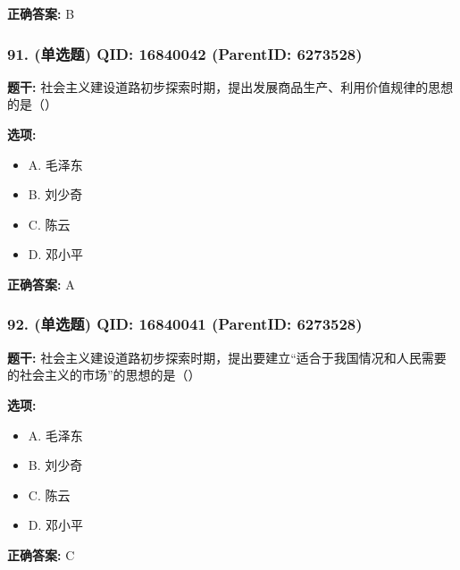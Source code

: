 \documentclass[12pt,UTF8]{ctexart}
\begin{document}
\textbf{正确答案:}
B

\vspace{0.3em}\hrulefill\vspace{0.7em}

\subsubsection*{91. (单选题) \small QID: 16840042 (ParentID: 6273528)}

\textbf{题干:}
社会主义建设道路初步探索时期，提出发展商品生产、利用价值规律的思想的是（）



\textbf{选项:}
\begin{itemize}[leftmargin=*]

  \item A. 毛泽东

  \item B. 刘少奇

  \item C. 陈云

  \item D. 邓小平

\end{itemize}

\textbf{正确答案:}
A

\vspace{0.3em}\hrulefill\vspace{0.7em}

\subsubsection*{92. (单选题) \small QID: 16840041 (ParentID: 6273528)}

\textbf{题干:}
社会主义建设道路初步探索时期，提出要建立“适合于我国情况和人民需要的社会主义的市场”的思想的是（）



\textbf{选项:}
\begin{itemize}[leftmargin=*]

  \item A. 毛泽东

  \item B. 刘少奇

  \item C. 陈云

  \item D. 邓小平

\end{itemize}

\textbf{正确答案:}
C
\end{document}
